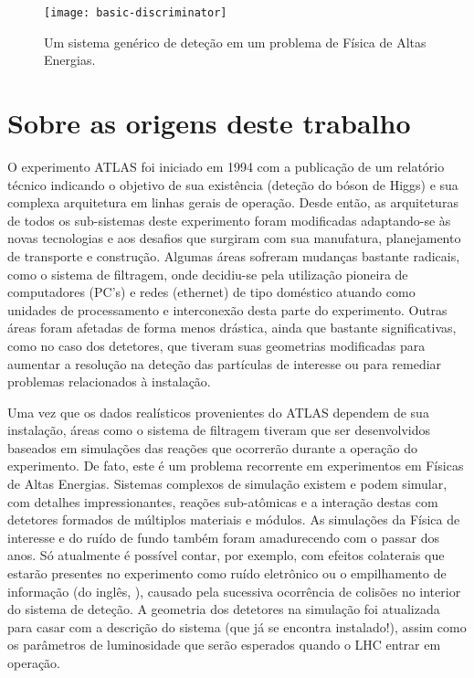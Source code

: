 \begin{figure}
\begin{center}
\texttt{[image: basic-discriminator]}
\end{center}
\caption{Um sistema genérico de deteção em um problema de Física de Altas
Energias.}
\label{fig:intro-disc}
\end{figure}

\section{Sobre as origens deste trabalho}

O experimento ATLAS foi iniciado em 1994 com a publicação de um relatório
técnico indicando o objetivo de sua existência (deteção do bóson de Higgs) e
sua complexa arquitetura em linhas gerais de operação. Desde então, as
arquiteturas de todos os sub-sistemas deste experimento foram modificadas
adaptando-se às novas tecnologias e aos desafios que surgiram com sua
manufatura, planejamento de transporte e construção. Algumas áreas sofreram
mudanças bastante radicais, como o sistema de filtragem, onde decidiu-se pela
utilização pioneira de computadores (PC's) e redes (ethernet) de tipo
doméstico atuando como unidades de processamento e interconexão desta parte do
experimento. Outras áreas foram afetadas de forma menos drástica, ainda que
bastante significativas, como no caso dos detetores, que tiveram suas
geometrias modificadas para aumentar a resolução na deteção das partículas de
interesse ou para remediar problemas relacionados à instalação.

Uma vez que os dados realísticos provenientes do ATLAS dependem de sua
instalação, áreas como o sistema de filtragem tiveram que ser desenvolvidos
baseados em simulações das reações que ocorrerão durante a operação do
experimento. De fato, este é um problema recorrente em experimentos em Físicas
de Altas Energias. Sistemas complexos de simulação existem e podem simular,
com detalhes impressionantes, reações sub-atômicas e a interação destas com
detetores formados de múltiplos materiais e módulos. As simulações da Física
de interesse e do ruído de fundo também foram amadurecendo com o passar dos
anos. Só atualmente é possível contar, por exemplo, com efeitos colaterais que
estarão presentes no experimento como ruído eletrônico ou o empilhamento de
informação (do inglês, ), causado pela sucessiva ocorrência de
colisões no interior do sistema de deteção. A geometria dos detetores na
simulação foi atualizada para casar com a descrição do sistema (que já se
encontra instalado!), assim como os parâmetros de luminosidade que serão
esperados quando o LHC entrar em operação.

